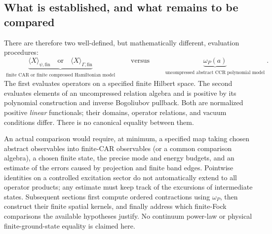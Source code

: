 \subsection{What is established, and what remains to be compared}

There are therefore two well-defined, but mathematically different,
evaluation procedures:
\begin{equation}
 \underbrace{\langle X\rangle_{\psi,\mathrm{fin}}
 \quad\text{or}\quad
 \langle X\rangle_{\Gamma,\mathrm{fin}}}_{
 \substack{\text{finite CAR or finite}\text{ compressed Hamiltonian model}}}
 \qquad\text{versus}\qquad
 \underbrace{\omega_P(a)}_{
 \substack{\text{uncompressed abstract}\text{ CCR polynomial model}}}.
 \label{eq:ch19-two-state-layers}
\end{equation}
The first evaluates operators on a specified finite Hilbert space.
The second evaluates elements of an uncompressed relation algebra and
is positive by its polynomial construction and inverse Bogoliubov
pullback.  Both are normalized positive \emph{linear} functionals;
their domains, operator relations, and vacuum conditions differ.
There is no canonical equality between them.

An actual comparison would require, at minimum, a specified map taking
chosen abstract observables into finite-CAR observables (or a common
comparison algebra), a chosen finite state, the precise mode and energy
budgets, and an estimate of the errors caused by projection and finite
band edges.  Pointwise identities on a controlled excitation sector do
not automatically extend to all operator products; any estimate must
keep track of the excursions of intermediate states.  Subsequent
sections first compute ordered contractions using $\omega_P$, then
construct their finite spatial kernels, and finally address which
finite-Fock comparisons the available hypotheses justify.  No continuum
power-law or physical finite-ground-state equality is claimed here.
